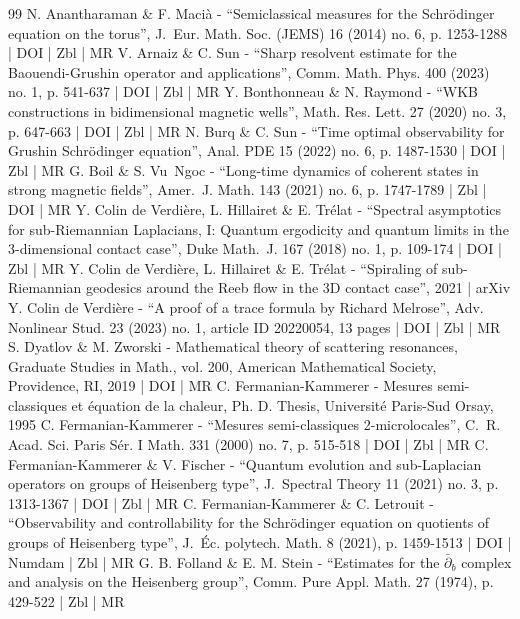 \documentclass[10pt]{amsart}
\theoremstyle{plain}
\theoremstyle{definition}
\theoremstyle{remark}
\begin{document}
\begin{thebibliography}{99}
N. Anantharaman \& F. Macià - “Semiclassical measures for the Schrödinger equation on the torus”, J. Eur. Math. Soc. (JEMS) 16 (2014) no. 6, p. 1253-1288 | DOI | Zbl | MR
V. Arnaiz \& C. Sun - “Sharp resolvent estimate for the Baouendi-Grushin operator and applications”, Comm. Math. Phys. 400 (2023) no. 1, p. 541-637 | DOI | Zbl | MR
Y. Bonthonneau \& N. Raymond - “WKB constructions in bidimensional magnetic wells”, Math. Res. Lett. 27 (2020) no. 3, p. 647-663 | DOI | Zbl | MR
N. Burq \& C. Sun - “Time optimal observability for Grushin Schrödinger equation”, Anal. PDE 15 (2022) no. 6, p. 1487-1530 | DOI | Zbl | MR
G. Boil \& S. Vu Ngoc - “Long-time dynamics of coherent states in strong magnetic fields”, Amer. J. Math. 143 (2021) no. 6, p. 1747-1789 | Zbl | DOI | MR
Y. Colin de Verdière, L. Hillairet \& E. Trélat - “Spectral asymptotics for sub-Riemannian Laplacians, I: Quantum ergodicity and quantum limits in the 3-dimensional contact case”, Duke Math. J. 167 (2018) no. 1, p. 109-174 | DOI | Zbl | MR
Y. Colin de Verdière, L. Hillairet \& E. Trélat - “Spiraling of sub-Riemannian geodesics around the Reeb flow in the 3D contact case”, 2021 | arXiv
Y. Colin de Verdière - “A proof of a trace formula by Richard Melrose”, Adv. Nonlinear Stud. 23 (2023) no. 1, article ID 20220054, 13 pages | DOI | Zbl | MR
S. Dyatlov \& M. Zworski - Mathematical theory of scattering resonances, Graduate Studies in Math., vol. 200, American Mathematical Society, Providence, RI, 2019 | DOI | MR
C. Fermanian-Kammerer - Mesures semi-classiques et équation de la chaleur, Ph. D. Thesis, Université Paris-Sud Orsay, 1995
C. Fermanian-Kammerer - “Mesures semi-classiques 2-microlocales”, C. R. Acad. Sci. Paris Sér. I Math. 331 (2000) no. 7, p. 515-518 | DOI | Zbl | MR
C. Fermanian-Kammerer \& V. Fischer - “Quantum evolution and sub-Laplacian operators on groups of Heisenberg type”, J. Spectral Theory 11 (2021) no. 3, p. 1313-1367 | DOI | Zbl | MR
C. Fermanian-Kammerer \& C. Letrouit - “Observability and controllability for the Schrödinger equation on quotients of groups of Heisenberg type”, J. Éc. polytech. Math. 8 (2021), p. 1459-1513 | DOI | Numdam | Zbl | MR
G. B. Folland \& E. M. Stein - “Estimates for the $\bar{\partial }_{b}$ complex and analysis on the Heisenberg group”, Comm. Pure Appl. Math. 27 (1974), p. 429-522 | Zbl | MR

\end{thebibliography}
\end{document}

